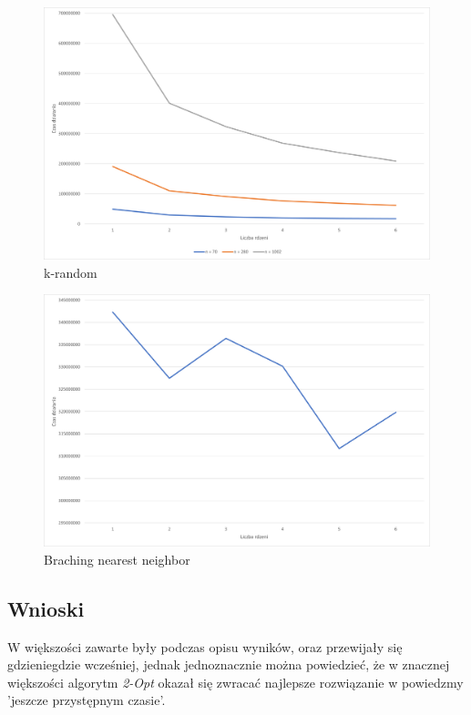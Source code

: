 \documentclass{article}
\begin{document}
\begin{figure}[H]
\includegraphics[scale=0.55]{k_random_parallel.png}
\caption{k-random}
\end{figure}

\begin{figure}[H]
\includegraphics[scale=0.55]{nearest_neighbor_parallel.png}
\caption{Braching nearest neighbor}
\end{figure}

\subsection{Wnioski}
W większości zawarte były podczas opisu wyników, oraz przewijały się gdzieniegdzie wcześniej, jednak jednoznacznie można powiedzieć, że w znacznej większości algorytm \textit{2-Opt} okazał się zwracać najlepsze rozwiązanie w powiedzmy 'jeszcze przystępnym czasie'. 
\end{document}
